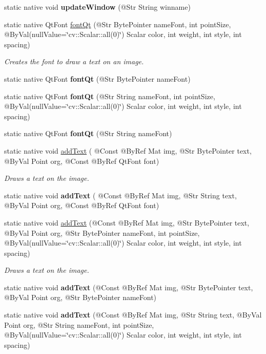\begin{DoxyCompactItemize}
static native void {\bfseries update\+Window} (@Str String winname)
\item 
static native Qt\+Font \hyperlink{group__highgui__qt_gaee437fe91204f6d6d9016c6a7b78850d}{font\+Qt} (@Str Byte\+Pointer name\+Font, int point\+Size, @By\+Val(null\+Value=\char`\"{}cv\+::\+Scalar\+::all(0)\char`\"{}) Scalar color, int weight, int style, int spacing)
\begin{DoxyCompactList}\small\item\em Creates the font to draw a text on an image. \end{DoxyCompactList}\item 
static native Qt\+Font {\bfseries font\+Qt} (@Str Byte\+Pointer name\+Font)
\item 
static native Qt\+Font {\bfseries font\+Qt} (@Str String name\+Font, int point\+Size, @By\+Val(null\+Value=\char`\"{}cv\+::\+Scalar\+::all(0)\char`\"{}) Scalar color, int weight, int style, int spacing)
\item 
static native Qt\+Font {\bfseries font\+Qt} (@Str String name\+Font)
\item 
static native void \hyperlink{group__highgui__qt_gaccc5f5d89abe18bc7adfd650dccb265f}{add\+Text} ( @Const @By\+Ref Mat img, @Str Byte\+Pointer text, @By\+Val Point org, @Const @By\+Ref Qt\+Font font)
\begin{DoxyCompactList}\small\item\em Draws a text on the image. \end{DoxyCompactList}\item 
static native void {\bfseries add\+Text} ( @Const @By\+Ref Mat img, @Str String text, @By\+Val Point org, @Const @By\+Ref Qt\+Font font)
\item 
static native void \hyperlink{group__highgui__qt_ga7595781df35faa10eff729ed3e41b5fd}{add\+Text} (@Const @By\+Ref Mat img, @Str Byte\+Pointer text, @By\+Val Point org, @Str Byte\+Pointer name\+Font, int point\+Size, @By\+Val(null\+Value=\char`\"{}cv\+::\+Scalar\+::all(0)\char`\"{}) Scalar color, int weight, int style, int spacing)
\begin{DoxyCompactList}\small\item\em Draws a text on the image. \end{DoxyCompactList}\item 
static native void {\bfseries add\+Text} (@Const @By\+Ref Mat img, @Str Byte\+Pointer text, @By\+Val Point org, @Str Byte\+Pointer name\+Font)
\item 
static native void {\bfseries add\+Text} (@Const @By\+Ref Mat img, @Str String text, @By\+Val Point org, @Str String name\+Font, int point\+Size, @By\+Val(null\+Value=\char`\"{}cv\+::\+Scalar\+::all(0)\char`\"{}) Scalar color, int weight, int style, int spacing)

\end{DoxyCompactItemize}
